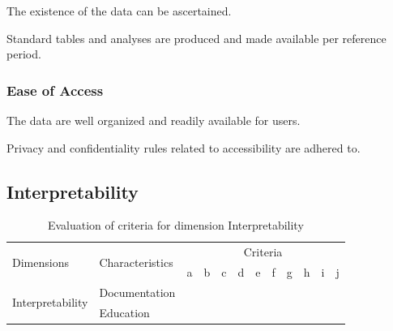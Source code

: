 \begin{QandA}
    \item The existence of the data can be ascertained.
    \begin{answered}
        
    \end{answered}

    \item Standard tables and analyses are produced and made available per reference period.
    \begin{answered}
        
    \end{answered}

\end{QandA}

\subsubsection{Ease of Access}

\begin{QandA}
    \item The data are well organized and readily available for users.
    \begin{answered}
        
    \end{answered}

    \item Privacy and confidentiality rules related to accessibility are adhered to.
    \begin{answered}
        
    \end{answered}

\end{QandA}

\subsection{Interpretability}

\begin{table}[htbp]
    \centering

    \begin{tabular}{llrrrrrrrrrr}
        \toprule
        \multirow{2}{*}{Dimensions}         & \multirow{2}{*}{Characteristics}  & \multicolumn{10}{c}{Criteria}         \\ \cmidrule(lr){3-12}
                                            &                                   & a & b & c & d & e & f & g & h & i & j \\ \midrule
        \multirow{2}{*}{Interpretability}   & Documentation                     &   &   &   &   &   &   &   &   &   &   \\
                                            & Education                         &   &   &   &   &   &   &   &   &   &   \\
        \bottomrule
    \end{tabular}

    \caption{Evaluation of criteria for dimension Interpretability}
    \label{table:interpretability-benchmark}
\end{table}
\FloatBarrier

